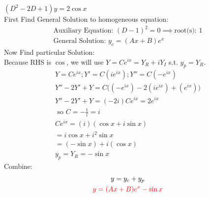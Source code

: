 \item [13.] $(D^2-2D+1)y=2\cos{x}$\\[2mm]
First Find General Solution to homogeneous equation:
\begin{gather*}
    \text{Auxiliary Equation: } (D-1)^2=0\implies \text{root(s): } 1\\
    \text{General Solution: } y_c=(Ax+B)e^x
\end{gather*}
Now Find particular Solution:\\
Because RHS is $\cos$, we will use $Y=Ce^{ix}=Y_R+iY_I$ s.t. $y_p=Y_R$. 
\begin{gather*}
    Y=Ce^{ix}; Y'=C(ie^{ix});Y''=C(-e^{ix})\\
    Y''-2Y'+Y = C
    \big(
    (-e^{ix})
    -2(ie^{ix})
    +(e^{ix})
    \big)\\
    Y''-2Y'+Y=(-2i)Ce^{ix}=2e^{ix}\\
    \text{ so } C=-\frac{1}{i}=i\\
    Ce^{ix}=(i)(\cos{x}+i\sin{x})\\
    =i\cos{x}+i^2\sin{x}\\
    = (-\sin{x})+i(\cos{x})\\
    y_p = Y_R = -\sin{x}
\end{gather*}
Combine:
\begin{gather*}
    y=y_c+y_p\\
    \textcolor{red}{y = (Ax+B)e^x-\sin{x}}
\end{gather*}